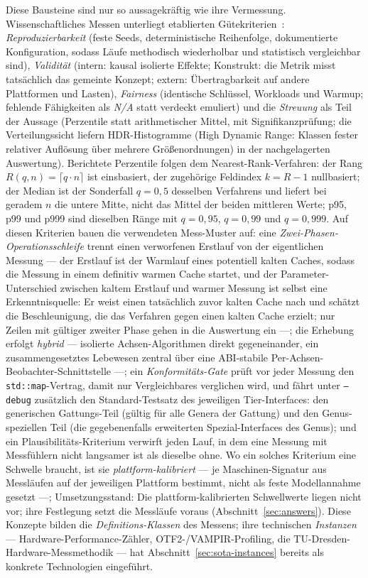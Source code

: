 \begin{nurlang}
Diese Bausteine sind nur so aussagekräftig wie ihre Vermessung. Wissenschaftliches Messen unterliegt
etablierten Gütekriterien~\cite{hoefler2015benchmarking}: \emph{Reproduzierbarkeit} (feste Seeds,
deterministische Reihenfolge, dokumentierte Konfiguration, sodass Läufe methodisch wiederholbar und
statistisch vergleichbar sind), \emph{Validität} (intern: kausal isolierte Effekte; Konstrukt: die Metrik
misst tatsächlich das gemeinte Konzept; extern: Übertragbarkeit auf andere Plattformen und Lasten),
\emph{Fairness} (identische Schlüssel, Workloads und
Warmup; fehlende Fähigkeiten als \emph{N/A} statt verdeckt emuliert) und die \emph{Streuung} als Teil der
Aussage (Perzentile statt arithmetischer Mittel, mit Signifikanzprüfung; die Verteilungssicht liefern
HDR-Histogramme (High Dynamic Range: Klassen fester relativer Auflösung über mehrere
Größenordnungen) in der nachgelagerten Auswertung). Berichtete Perzentile folgen dem
Nearest-Rank-Verfahren: der Rang $R(q,n)=\lceil q\cdot n\rceil$ ist einsbasiert, der zugehörige
Feldindex $k=R-1$ nullbasiert; der Median ist der Sonderfall $q=0{,}5$ desselben Verfahrens und
liefert bei geradem $n$ die untere Mitte, nicht das Mittel der beiden mittleren Werte; p95, p99 und
p999 sind dieselben Ränge mit $q=0{,}95$, $q=0{,}99$ und $q=0{,}999$. Auf diesen
Kriterien bauen die verwendeten Mess-Muster auf: eine \emph{Zwei-Phasen-Operationsschleife} trennt einen
verworfenen Erstlauf von der eigentlichen Messung --- der Erstlauf ist der Warmlauf eines potentiell
kalten Caches, sodass die Messung in einem definitiv warmen Cache startet, und der Parameter-Unterschied
zwischen kaltem Erstlauf und warmer Messung ist selbst eine Erkenntnisquelle: Er weist einen tatsächlich
zuvor kalten Cache nach und schätzt die Beschleunigung, die das Verfahren gegen einen kalten Cache
erzielt; nur Zeilen mit gültiger zweiter Phase gehen in die Auswertung ein ---; die Erhebung erfolgt
\emph{hybrid} --- isolierte Achsen-Algorithmen direkt gegeneinander, ein zusammengesetztes Lebewesen
zentral über eine ABI-stabile Per-Achsen-Beobachter-Schnittstelle ---; ein \emph{Konformitäts-Gate}
prüft vor jeder Messung den \texttt{std::map}-Vertrag, damit nur Vergleichbares verglichen wird, und fährt
unter \texttt{--debug} zusätzlich den Standard-Testsatz des jeweiligen Tier-Interfaces: den generischen
Gattungs-Teil (gültig für alle Genera der Gattung) und den Genus-speziellen Teil (die gegebenenfalls
erweiterten Spezial-Interfaces des Genus); und ein
Plausibilitäts-Kriterium verwirft jeden Lauf, in dem eine Messung mit Messfühlern nicht langsamer ist als
dieselbe ohne. Wo ein solches Kriterium eine Schwelle braucht, ist sie \emph{plattform-kalibriert} ---
je Maschinen-Signatur aus Messläufen auf der jeweiligen Plattform bestimmt, nicht als feste
Modellannahme gesetzt ---; Umsetzungsstand: Die plattform-kalibrierten Schwellwerte liegen nicht vor; ihre
Festlegung setzt die Messläufe voraus (Abschnitt~\ref{sec:answers}). Diese Konzepte bilden die
\emph{Definitions-Klassen} des Messens; ihre technischen \emph{Instanzen} --- Hardware-Performance-Zähler,
OTF2-/VAMPIR-Profiling, die TU-Dresden-Hardware-Messmethodik --- hat Abschnitt~\ref{sec:sota-instances}
bereits als konkrete Technologien eingeführt.
\end{nurlang}

